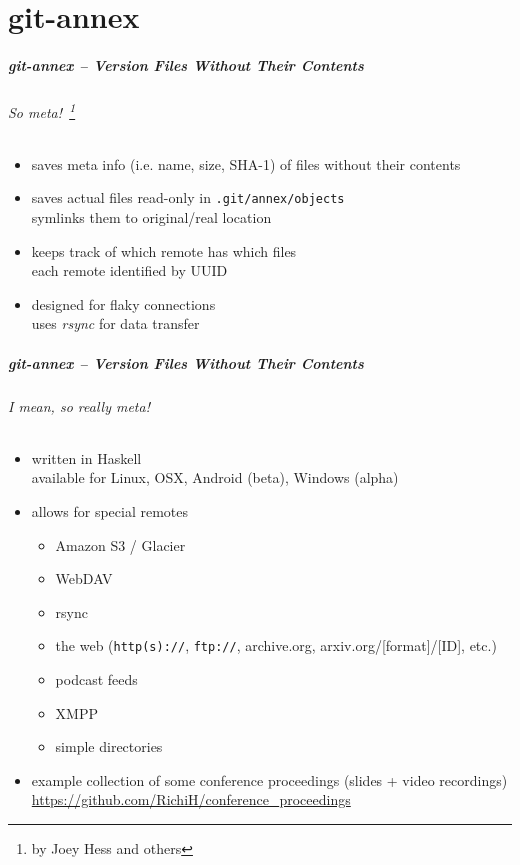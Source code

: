 \documentclass[english,hyperref={pdfpagelabels=false},aspectratio=1610]{beamer}
\begin{document}
\part{git-annex}
\makepart

\begin{frame}[label=gitannex]
  \frametitle{git-annex -- Version Files Without Their Contents}
  \framesubtitle{So meta!~\footnote{\tiny by Joey Hess and others}}
  \begin{itemize}
    \item saves meta info {\scriptsize\color{fzjgray50}(i.e. name, size, SHA-1)} of files without their contents
    \item saves actual files read-only in \texttt{.git/annex/objects}\\
      {\scriptsize symlinks them to original/real location}
    \item keeps track of which remote has which files\\
      {\scriptsize each remote identified by UUID}
    \item designed for flaky connections\\
      {\scriptsize uses \emph{rsync} for data transfer}
  \end{itemize}
\end{frame}

\begin{frame}
  \frametitle{git-annex -- Version Files Without Their Contents}
  \framesubtitle{I mean, so really meta!}
  \begin{itemize}
    \item written in Haskell\\
      {\scriptsize available for Linux, OSX, Android (beta), Windows (alpha)}
    \item allows for special remotes
      \begin{itemize}
        \item Amazon S3 / Glacier
        \item WebDAV
        \item rsync
        \item the web {\scriptsize\color{fzjgray50}(\texttt{http(s)://}, \texttt{ftp://}, archive.org, arxiv.org/[format]/[ID], etc.)}
        \item podcast feeds
        \item XMPP
        \item simple directories
      \end{itemize}
    \item example collection of some conference proceedings {\scriptsize\color{fzjgray50}(slides + video recordings)}\\
      {\scriptsize \url{https://github.com/RichiH/conference_proceedings}}
  \end{itemize}
\end{frame}
\end{document}

